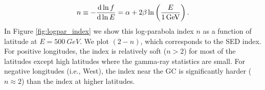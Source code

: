 \begin{equation}
\lb{eq:log_par}
n \equiv - \frac{\de \ln f}{\de \ln E} = \alpha + 2 \beta \ln\left(\frac{E}{\SI{1}{GeV}}\right).
\end{equation}
In Figure \ref{fig:logpar_index} we show this log-parabola index $n$ as a function of latitude at $E = \SI{500}{GeV}$. 
We plot $(2 - n)$, which corresponds to the SED index.
For positive longitudes, the index is relatively soft ($n > 2$) for most of the latitudes
except high latitudes where the gamma-ray statistics are small.
For negative longitudes (i.e., West), the index near the GC
is significantly harder ($n \approx 2$) than the index at higher latitudes.
